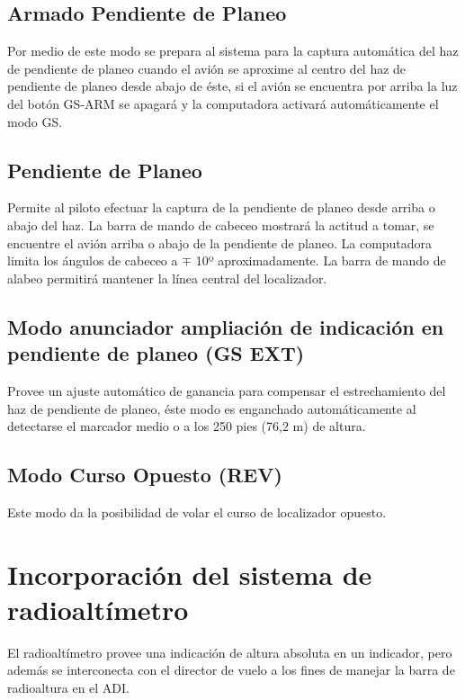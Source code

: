 \documentclass[a4paper,12pt,twoside]{article}
\begin{document}
\subsection{Armado Pendiente de Planeo}
\label{sec:GS.arm}

Por medio de este modo se prepara al sistema para la captura
autom\'atica del haz de pendiente de planeo 
cuando el avi\'on se aproxime al centro del haz de pendiente
de planeo desde abajo de \'este, si el avi\'on se encuentra
por arriba la luz del bot\'on GS-ARM se apagar\'a y la
computadora activar\'a autom\'aticamente el modo GS.

\subsection{Pendiente de Planeo}
\label{sec:gs}

Permite al piloto efectuar la captura de la pendiente de planeo
desde arriba o abajo del haz. La barra de mando de cabeceo mostrar\'a
la actitud a tomar, se encuentre el avi\'on arriba o abajo de la pendiente
de planeo.
La computadora limita los \'angulos de cabeceo a $\mp$ 10º aproximadamente.
La barra de mando de alabeo permitir\'a mantener la l\'inea central del
localizador.

\subsection{Modo anunciador ampliaci\'on de indicaci\'on en pendiente de planeo (GS EXT)}
\label{sec:gs.ext}

Provee un ajuste autom\'atico de ganancia para compensar el estrechamiento
del haz de pendiente de planeo, \'este modo es enganchado
autom\'aticamente al detectarse el marcador medio o a los 250 pies (76,2 m)
de altura.

\subsection{Modo Curso Opuesto (REV)}
\label{sec:rev}

Este modo da la posibilidad de volar el curso de localizador opuesto.

\section{Incorporaci\'on del sistema de radioalt\'imetro}
\label{sec:incorporacion.sistema.radio.altimetro}

El radioalt\'imetro provee una indicaci\'on de altura absoluta en un indicador,
pero adem\'as se interconecta con el director de vuelo a los fines
de manejar la barra de radioaltura en el ADI.
\end{document}
